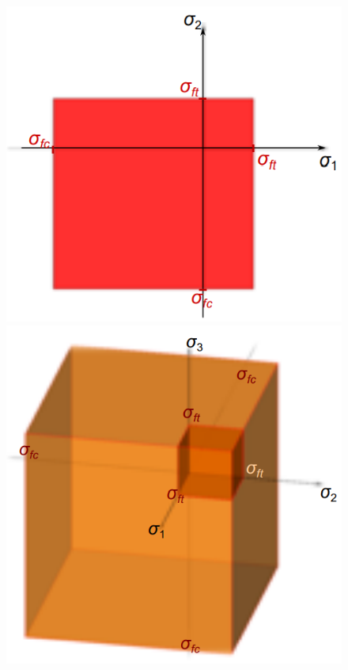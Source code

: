 \documentclass[class=report, crop=false, 12pt,a4paper]{standalone}
\begin{document}
\begin{figure}
  \begin{center}
    \begin{minipage}[b]{0.46\textwidth}
      \centering
      \includegraphics[width = \textwidth]{../img/diagram15.png}
      \caption{}
    \end{minipage}
    \begin{minipage}[b]{0.46\textwidth}
      \centering
      \includegraphics[width = \textwidth]{../img/diagram16.png}
      \caption{}
    \end{minipage}
  \end{center}
\end{figure}
\end{document}
